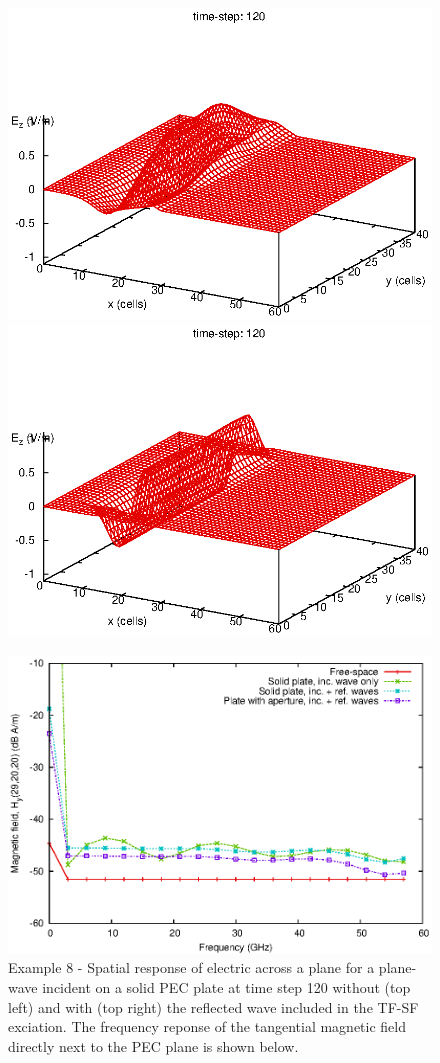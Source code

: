\documentclass[onecolumn,a4paper]{article}
\numberwithin{equation}{section}
\begin{document}
\begin{figure}[ht!]
 \includegraphics[width=0.49\linewidth]{figures/aperture-solid-frame000120}
 \includegraphics[width=0.49\linewidth]{figures/aperture-solidreflect-frame000120}
 \centerline{\includegraphics[width=0.80\linewidth]{figures/aperture-Hsc}} 
 \caption{\label{fg:aperture-incident} Example 8 - Spatial response of electric across a plane for a plane-wave incident on a
 solid PEC plate at time step 120 without (top left) and with (top right) the reflected wave 
 included in the TF-SF exciation. The frequency reponse of the tangential magnetic field directly next to the
 PEC plane is shown below.}
\end{figure}
\end{document}
